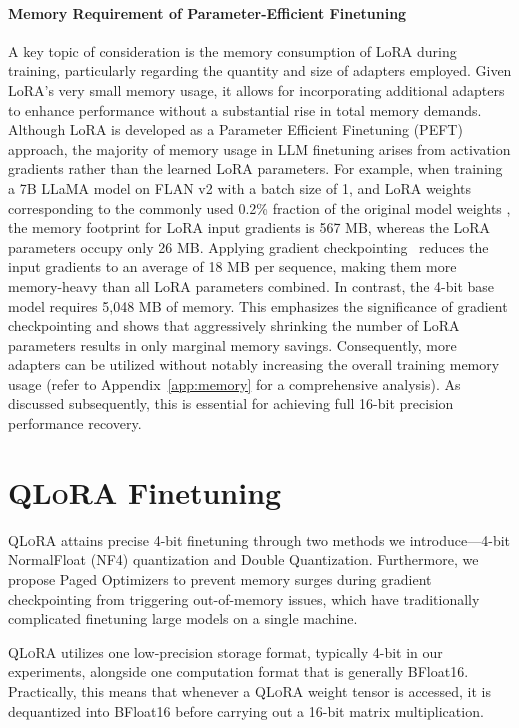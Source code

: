 \paragraph{Memory Requirement of Parameter-Efficient Finetuning} A key topic of consideration is the memory consumption of LoRA during training, particularly regarding the quantity and size of adapters employed. Given LoRA's very small memory usage, it allows for incorporating additional adapters to enhance performance without a substantial rise in total memory demands. Although LoRA is developed as a Parameter Efficient Finetuning (PEFT) approach, the majority of memory usage in LLM finetuning arises from activation gradients rather than the learned LoRA parameters. For example, when training a 7B LLaMA model on FLAN v2 with a batch size of 1, and LoRA weights corresponding to the commonly used 0.2\% fraction of the original model weights \citep{hu2021lora,liu2022few}, the memory footprint for LoRA input gradients is 567 MB, whereas the LoRA parameters occupy only 26 MB. Applying gradient checkpointing~\citep{chen2016training} reduces the input gradients to an average of 18 MB per sequence, making them more memory-heavy than all LoRA parameters combined. In contrast, the 4-bit base model requires 5,048 MB of memory. This emphasizes the significance of gradient checkpointing and shows that aggressively shrinking the number of LoRA parameters results in only marginal memory savings. Consequently, more adapters can be utilized without notably increasing the overall training memory usage (refer to Appendix~\ref{app:memory} for a comprehensive analysis). As discussed subsequently, this is essential for achieving full 16-bit precision performance recovery.

\section{\textsc{QLoRA} Finetuning}

\textsc{QLoRA} attains precise 4-bit finetuning through two methods we introduce—4-bit NormalFloat (NF4) quantization and Double Quantization. Furthermore, we propose Paged Optimizers to prevent memory surges during gradient checkpointing from triggering out-of-memory issues, which have traditionally complicated finetuning large models on a single machine.

\textsc{QLoRA} utilizes one low-precision storage format, typically 4-bit in our experiments, alongside one computation format that is generally BFloat16. Practically, this means that whenever a \textsc{QLoRA} weight tensor is accessed, it is dequantized into BFloat16 before carrying out a 16-bit matrix multiplication.

